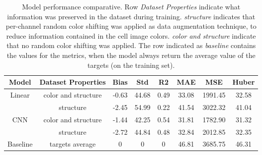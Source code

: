 \begin{table}[!ht]
  \centering
  \begin{tabular}{c|c|c|c|c|c|c|c}
    Model & Dataset Properties & Bias & Std & R2 & MAE & MSE & Huber \\
    \hline
    \multirow{2}{*}{Linear} & color and structure & -0.63 & 44.68 & 0.49 & 33.08 & 1991.45 & 32.58 \\
    \cline{2-8}
     & structure & -2.45 & 54.99 & 0.22 & 41.54 & 3022.32 & 41.04 \\
     \hline
     \multirow{2}{*}{CNN} & color and structure & -1.44 & 42.25 & 0.54 & 31.81 & 1782.90 & 31.32 \\
     \cline{2-8}
      & structure & -2.72 & 44.84 & 0.48 & 32.84 & 2012.85 & 32.35 \\
      \hline
      Baseline & targets average & 0 & 0 & 0 & 46.81 & 3685.75 & 46.31 \\
  \end{tabular}
  \caption{Model performance comparative. Row \textit{Dataset Properties} indicate what information was preserved in the dataset during training. \textit{structure} indicates that per-channel random color shifting was applied as data augmentation technique, to reduce information contained in the cell image colors. \textit{color and structure} indicate that no random color shifting was applied. The row indicated as \textit{baseline} contains the values for the metrics, when the model always return the average value  of the targets (on the training set).}
  \label{table:results:model_performance_comparative}
\end{table}

